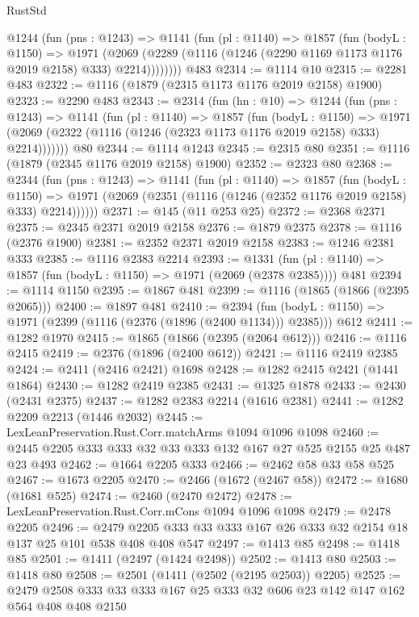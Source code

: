 \begin{lexlean}{RustStd}
\begin{coremodule}
{\begin{coremodule}
{{{{{{{{{{{      @1244
        (fun (pns : @1243) =>
        @1141
          (fun (pl : @1140) =>
          @1857
            (fun (bodyL : @1150) =>
            @1971
              (@2069 (@2289 (@1116 (@1246 (@2290 @1169 @1173 @1176 @2019 @2158) @333) @2214))))))))
    @483
@2314 := @1114 @10
@2315 := @2281 @483
@2322 := @1116 (@1879 (@2315 @1173 @1176 @2019 @2158) @1900)
@2323 := @2290 @483
@2343 := @2314
    (fun (hn : @10) =>
    @1244
      (fun (pns : @1243) =>
      @1141
        (fun (pl : @1140) =>
        @1857
          (fun (bodyL : @1150) =>
          @1971 (@2069 (@2322 (@1116 (@1246 (@2323 @1173 @1176 @2019 @2158) @333) @2214)))))))
    @80
@2344 := @1114 @1243
@2345 := @2315 @80
@2351 := @1116 (@1879 (@2345 @1176 @2019 @2158) @1900)
@2352 := @2323 @80
@2368 := @2344
    (fun (pns : @1243) =>
    @1141
      (fun (pl : @1140) =>
      @1857
        (fun (bodyL : @1150) =>
        @1971 (@2069 (@2351 (@1116 (@1246 (@2352 @1176 @2019 @2158) @333) @2214))))))
@2371 := @145 (@11 @253 @25)
@2372 := @2368 @2371
@2375 := @2345 @2371 @2019 @2158
@2376 := @1879 @2375
@2378 := @1116 (@2376 @1900)
@2381 := @2352 @2371 @2019 @2158
@2383 := @1246 @2381 @333
@2385 := @1116 @2383 @2214
@2393 := @1331 (fun (pl : @1140) => @1857 (fun (bodyL : @1150) => @1971 (@2069 (@2378 @2385)))) @481
@2394 := @1114 @1150
@2395 := @1867 @481
@2399 := @1116 (@1865 (@1866 (@2395 @2065)))
@2400 := @1897 @481
@2410 := @2394
    (fun (bodyL : @1150) => @1971 (@2399 (@1116 (@2376 (@1896 (@2400 @1134))) @2385)))
    @612
@2411 := @1282 @1970
@2415 := @1865 (@1866 (@2395 (@2064 @612)))
@2416 := @1116 @2415
@2419 := @2376 (@1896 (@2400 @612))
@2421 := @1116 @2419 @2385
@2424 := @2411 (@2416 @2421) @1698
@2428 := @1282 @2415 @2421 (@1441 @1864)
@2430 := @1282 @2419 @2385
@2431 := @1325 @1878
@2433 := @2430 (@2431 @2375)
@2437 := @1282 @2383 @2214 (@1616 @2381)
@2441 := @1282 @2209 @2213 (@1446 @2032)
@2445 := LexLeanPreservation.Rust.Corr.matchArms @1094 @1096 @1098
@2460 := @2445 @2205 @333 @333 @32 @33 @333 @132 @167 @27 @525 @2155 @25 @487 @23 @493
@2462 := @1664 @2205 @333
@2466 := @2462 @58 @33 @58 @525
@2467 := @1673 @2205
@2470 := @2466 (@1672 (@2467 @58))
@2472 := @1680 (@1681 @525)
@2474 := @2460 (@2470 @2472)
@2478 := LexLeanPreservation.Rust.Corr.mCons @1094 @1096 @1098
@2479 := @2478 @2205
@2496 := @2479 @2205 @333 @33 @333 @167 @26 @333 @32 @2154 @18 @137 @25 @101 @538 @408 @408 @547
@2497 := @1413 @85
@2498 := @1418 @85
@2501 := @1411 (@2497 (@1424 @2498))
@2502 := @1413 @80
@2503 := @1418 @80
@2508 := @2501 (@1411 (@2502 (@2195 @2503)) @2205)
@2525 := @2479 @2508 @333 @33 @333 @167 @25 @333 @32 @606 @23 @142 @147 @162 @564 @408 @408 @2150
}}}}}}}}}}}
\end{coremodule}}
\end{coremodule}
\end{lexlean}
